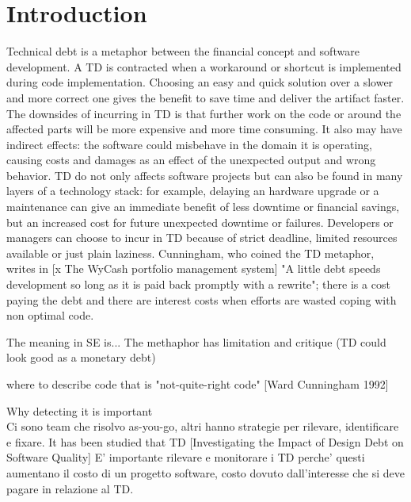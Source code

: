 \chapter{Introduction}
Technical debt is a metaphor between the financial concept and software development.
A TD is contracted when a workaround or shortcut is implemented during code implementation.
Choosing an easy and quick solution over a slower and more correct one gives the benefit to save time and deliver the artifact faster. 
The downsides of incurring in TD is that further work on the code or around the affected parts will be more expensive and more time consuming. It also may have indirect effects: the software could misbehave in the domain it is operating, causing costs and damages as an effect of the unexpected output and wrong behavior.
TD do not only affects software projects but can also be found in many layers of a technology stack: for example, delaying an hardware upgrade or a maintenance can give an immediate benefit of less downtime or financial savings, but an increased cost for future unexpected downtime or failures.
Developers or managers can choose to incur in TD because of strict deadline, limited resources available or just plain laziness.
Cunningham, who coined the TD metaphor, writes in [x The WyCash portfolio management system] "A little debt speeds development so long as it is paid back promptly with a rewrite"; there is a cost paying the debt and there are interest costs when efforts are wasted coping with non optimal code.


The meaning in SE is...
The methaphor has limitation and critique (TD could look good as a monetary debt)


where  to describe code that is "not-quite-right code" [Ward Cunningham 1992] 


Why detecting it is important\\
Ci sono team che risolvo as-you-go, altri hanno strategie per rilevare, identificare e fixare.
It has been studied that TD [Investigating the Impact of Design Debt on Software Quality]
E' importante rilevare e monitorare i TD perche' questi aumentano il costo di un progetto software, costo dovuto dall'interesse che si deve pagare in relazione al TD.

\newpage




